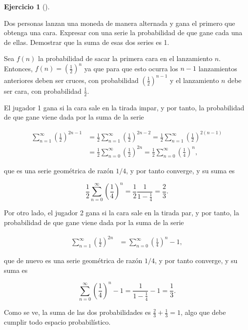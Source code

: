 \documentclass[
  spanish,
  a4paper,
]{scrreport}
\theoremstyle{definition}
\newtheorem{exercise}{Ejercicio}[chapter]
\theoremstyle{remark}
\begin{document}
\begin{exercise}[]\protect\hypertarget{exr-6}{}\label{exr-6}

Dos personas lanzan una moneda de manera alternada y gana el primero que
obtenga una cara. Expresar con una serie la probabilidad de que gane
cada una de ellas. Demostrar que la suma de esas dos series es 1.

\end{exercise}

\begin{tcolorbox}[enhanced jigsaw, arc=.35mm, bottomrule=.15mm, bottomtitle=1mm, breakable, colback=white, colbacktitle=quarto-callout-tip-color!10!white, colframe=quarto-callout-tip-color-frame, coltitle=black, left=2mm, leftrule=.75mm, opacityback=0, opacitybacktitle=0.6, rightrule=.15mm, title=\textcolor{quarto-callout-tip-color}{\faLightbulb}\hspace{0.5em}{Solución}, titlerule=0mm, toprule=.15mm, toptitle=1mm]

Sea \(f(n)\) la probabilidad de sacar la primera cara en el lanzamiento
\(n\). Entonces, \(f(n)=\left(\frac{1}{2}\right)^n\) ya que para que
esto ocurra los \(n-1\) lanzamientos anteriores deben ser cruces, con
probabilidad \(\left(\frac{1}{2}\right)^{n-1}\) y el lanzamiento \(n\)
debe ser cara, con probabilidad \(\frac{1}{2}\).

El jugador 1 gana si la cara sale en la tirada impar, y por tanto, la
probabilidad de que gane viene dada por la suma de la serie

\begin{align*}
\sum_{n=1}^\infty \left(\frac{1}{2}\right)^{2n-1}
&= \frac{1}{2}\sum_{n=1}^\infty \left(\frac{1}{2}\right)^{2n-2} 
= \frac{1}{2}\sum_{n=1}^\infty \left(\frac{1}{2}\right)^{2(n-1)}\\
&= \frac{1}{2}\sum_{n=0}^\infty \left(\frac{1}{2}\right)^{2n}
= \frac{1}{2}\sum_{n=0}^\infty \left(\frac{1}{4}\right)^n,
\end{align*}

que es una serie geométrica de razón \(1/4\), y por tanto converge, y su
suma es

\[
\frac{1}{2}\sum_{n=0}^\infty \left(\frac{1}{4}\right)^n
= \frac{1}{2}\frac{1}{1-\frac{1}{4}}
= \frac{2}{3}. 
\]

Por otro lado, el jugador 2 gana si la cara sale en la tirada par, y por
tanto, la probabilidad de que gane viene dada por la suma de la serie

\begin{align*}
\sum_{n=1}^\infty \left(\frac{1}{2}\right)^{2n}
&= \sum_{n=0}^\infty \left(\frac{1}{4}\right)^n - 1,
\end{align*}

que de nuevo es una serie geométrica de razón \(1/4\), y por tanto
converge, y su suma es

\[
\sum_{n=0}^\infty \left(\frac{1}{4}\right)^n - 1 
= \frac{1}{1-\frac{1}{4}} - 1
= \frac{1}{3}. 
\]

Como se ve, la suma de las dos probabilidades es
\(\frac{2}{3} + \frac{1}{3} = 1\), algo que debe cumplir todo espacio
probabilístico.

\end{tcolorbox}
\end{document}
